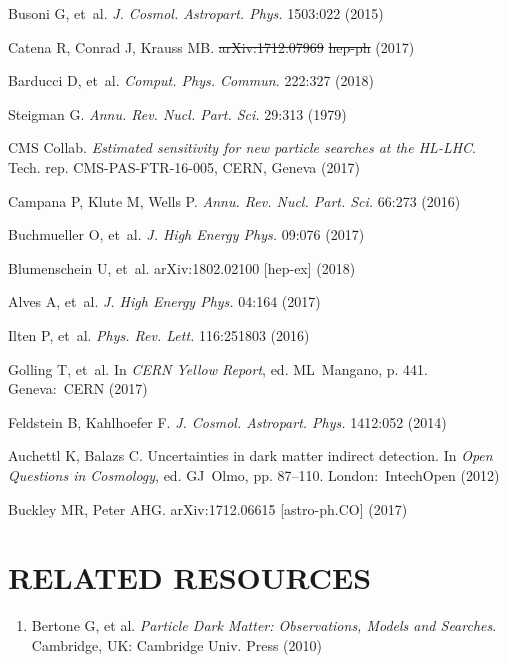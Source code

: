 \documentclass{ar-1col}
\providecommand{\DIFadd}[1]{{\protect\color{blue}\uwave{#1}}} %
\providecommand{\DIFdel}[1]{{\protect\color{red}\sout{#1}}}                      %
\providecommand{\DIFaddbegin}{} %
\providecommand{\DIFaddend}{} %
\providecommand{\DIFdelbegin}{} %
\providecommand{\DIFdelend}{} %
\begin{document}
{\begin{thebibliography}{175}
Busoni G, et~al. \textit{J. Cosmol. Astropart. Phys.} 1503:022 (2015)

Catena R, Conrad J, Krauss MB. \DIFdelbegin \DIFdel{arXiv:1712.07969 }%
\DIFdel{hep-ph}%
\DIFdelend \DIFaddbegin \textit{\DIFadd{Phys. Rev.}} \textit{\DIFadd{D}} \DIFadd{97:103002 }\DIFaddend (2017)

Barducci D, et~al. \textit{Comput. Phys. Commun.} 222:327 (2018)

Steigman G. \textit{Annu. Rev. Nucl. Part. Sci.} 29:313 (1979)

{CMS Collab}. \textit{Estimated sensitivity for new particle searches at the HL-LHC}.
Tech. rep. CMS-PAS-FTR-16-005, CERN, Geneva (2017)

Campana P, Klute M, Wells P. \textit{Annu. Rev. Nucl. Part. Sci.}
66:273 (2016)

Buchmueller O, et~al. \textit{J. High Energy Phys.} 09:076 (2017)
\DIFaddbegin 

\DIFaddend {}
Blumenschein U, et~al. arXiv:1802.02100 [hep-ex] (2018)


Alves A, et~al. \textit{J. High Energy Phys.} 04:164 (2017)

Ilten P, et~al. \textit{Phys. Rev. Lett.} 116:251803 (2016)

Golling T, et~al. In \textit{CERN Yellow Report}, ed. ML\ Mangano, p. 441. Geneva:\ CERN (2017)

Feldstein B, Kahlhoefer F. \textit{J. Cosmol. Astropart. Phys.} 1412:052 (2014)

Auchettl K, Balazs C. {Uncertainties in dark matter indirect detection}. In \textit{Open Questions in Cosmology}, ed. GJ\ Olmo, pp. 87--110. London:\ IntechOpen (2012)

Buckley MR, Peter AHG. arXiv:1712.06615 [astro-ph.CO] (2017)


\end{thebibliography}

\section*{RELATED RESOURCES}
 \begin{enumerate} 
\item Bertone G, et al. \textit{Particle Dark Matter: Observations, Models and Searches}. Cambridge, UK: Cambridge Univ. Press (2010)%


\end{enumerate}}
\end{document}

